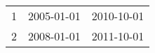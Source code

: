 % 
\begin{tabular}{ccc}
  \hline
  \hline
1 & 2005-01-01 & 2010-10-01 \\ 
  2 & 2008-01-01 & 2011-10-01 \\ 
   \hline
\end{tabular}
